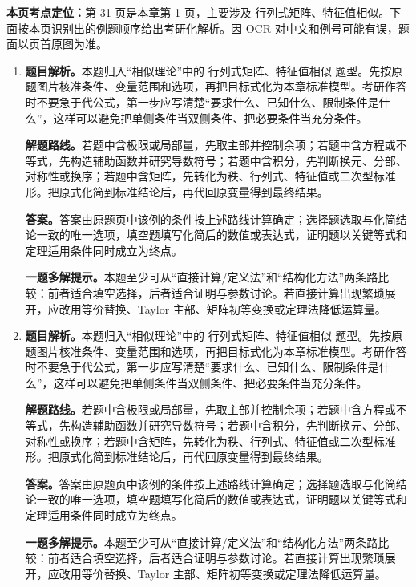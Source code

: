\begin{solutionblock}
\textbf{本页考点定位：}第 31 页是本章第 1 页，主要涉及 行列式矩阵、特征值相似。下面按本页识别出的例题顺序给出考研化解析。因 OCR 对中文和例号可能有误，题面以页首原图为准。

\begin{enumerate}[label=\textbf{例\arabic*.}, leftmargin=2.4em]

\item \textbf{题目解析。}本题归入“相似理论”中的 行列式矩阵、特征值相似 题型。先按原题图片核准条件、变量范围和选项，再把目标式化为本章标准模型。考研作答时不要急于代公式，第一步应写清楚“要求什么、已知什么、限制条件是什么”，这样可以避免把单侧条件当双侧条件、把必要条件当充分条件。

\textbf{解题路线。}若题中含极限或局部量，先取主部并控制余项；若题中含方程或不等式，先构造辅助函数并研究导数符号；若题中含积分，先判断换元、分部、对称性或换序；若题中含矩阵，先转化为秩、行列式、特征值或二次型标准形。把原式化简到标准结论后，再代回原变量得到最终结果。

\textbf{答案。}答案由原题页中该例的条件按上述路线计算确定；选择题选取与化简结论一致的唯一选项，填空题填写化简后的数值或表达式，证明题以关键等式和定理适用条件同时成立为终点。

\textbf{一题多解提示。}本题至少可从“直接计算/定义法”和“结构化方法”两条路比较：前者适合填空选择，后者适合证明与参数讨论。若直接计算出现繁琐展开，应改用等价替换、Taylor 主部、矩阵初等变换或定理法降低运算量。

\item \textbf{题目解析。}本题归入“相似理论”中的 行列式矩阵、特征值相似 题型。先按原题图片核准条件、变量范围和选项，再把目标式化为本章标准模型。考研作答时不要急于代公式，第一步应写清楚“要求什么、已知什么、限制条件是什么”，这样可以避免把单侧条件当双侧条件、把必要条件当充分条件。

\textbf{解题路线。}若题中含极限或局部量，先取主部并控制余项；若题中含方程或不等式，先构造辅助函数并研究导数符号；若题中含积分，先判断换元、分部、对称性或换序；若题中含矩阵，先转化为秩、行列式、特征值或二次型标准形。把原式化简到标准结论后，再代回原变量得到最终结果。

\textbf{答案。}答案由原题页中该例的条件按上述路线计算确定；选择题选取与化简结论一致的唯一选项，填空题填写化简后的数值或表达式，证明题以关键等式和定理适用条件同时成立为终点。

\textbf{一题多解提示。}本题至少可从“直接计算/定义法”和“结构化方法”两条路比较：前者适合填空选择，后者适合证明与参数讨论。若直接计算出现繁琐展开，应改用等价替换、Taylor 主部、矩阵初等变换或定理法降低运算量。

\end{enumerate}
\end{solutionblock}



